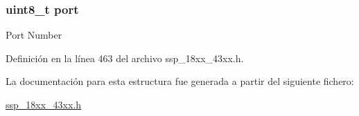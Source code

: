 \subsubsection[{\texorpdfstring{port}{port}}]{\setlength{\rightskip}{0pt plus 5cm}uint8\+\_\+t port}\hypertarget{struct_s_p_i___address__t_a2fa54f9024782843172506fadbee2ac8}{}\label{struct_s_p_i___address__t_a2fa54f9024782843172506fadbee2ac8}
Port Number 

Definición en la línea 463 del archivo ssp\+\_\+18xx\+\_\+43xx.\+h.



La documentación para esta estructura fue generada a partir del siguiente fichero\+:\begin{DoxyCompactItemize}
\item 
\hyperlink{ssp__18xx__43xx_8h}{ssp\+\_\+18xx\+\_\+43xx.\+h}\end{DoxyCompactItemize}
